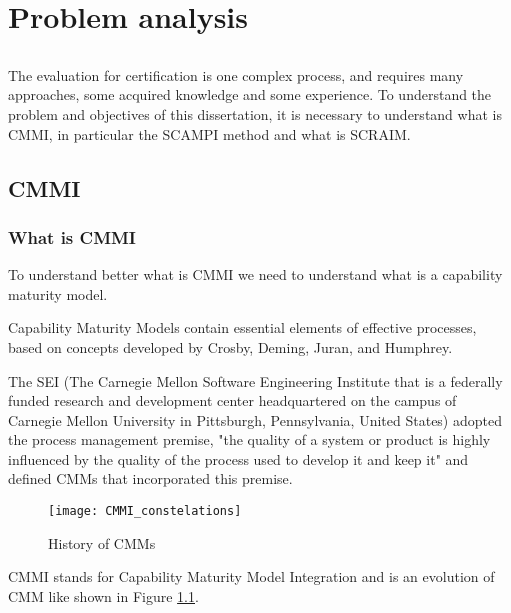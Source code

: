 \chapter{Problem analysis} \label{chap:problem}

\section*{}

The evaluation for certification is one complex process, and requires many approaches, some acquired knowledge and some experience. To understand the problem and objectives of this dissertation, it is necessary to understand what is CMMI, in particular the SCAMPI \citep{SCAMPITeam2013} method and what is SCRAIM.

\section{CMMI}

\subsection{What is CMMI}

To understand better what is CMMI \citep{Development2010} we need to understand what is a capability maturity model.

Capability Maturity Models\citep{fraser2002use} contain essential elements of effective processes, based on concepts developed by Crosby, Deming, Juran, and Humphrey.

The SEI (The Carnegie Mellon Software Engineering Institute that is a federally funded research and development center headquartered on the campus of Carnegie Mellon University in Pittsburgh, Pennsylvania, United States) adopted the process management premise, "the quality of a system or product is highly influenced by the quality of the process used to develop it and keep it" and defined CMMs that incorporated this premise.

\begin{figure}[h]
	\begin{center}
		\leavevmode
		\texttt{[image: CMMI\_constelations]}
		\caption{History of CMMs}
		\label{fig:historycmmi}
	\end{center}
\end{figure}


CMMI stands for Capability Maturity Model Integration and is an evolution of CMM like shown in Figure \ref{fig:historycmmi}.

